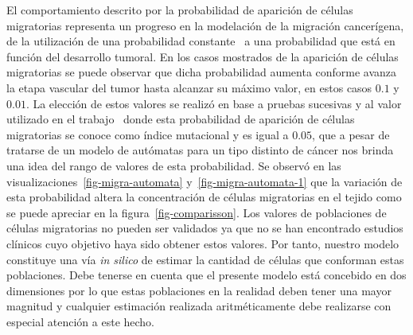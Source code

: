 El comportamiento descrito por la probabilidad de aparici\'on de c\'elulas migratorias representa un progreso en la modelaci\'on de la migraci\'on cancer\'igena, de la utilizaci\'on de una probabilidad constante~\cite{kansal3} a una probabilidad que est\'a en funci\'on del desarrollo tumoral. En los casos mostrados de la aparici\'on de c\'elulas migratorias se puede observar que dicha probabilidad aumenta conforme avanza la etapa vascular del tumor hasta alcanzar su m\'aximo valor, en estos casos $0$.$1$ y $0$.$01$. La elecci\'on de estos valores se realiz\'o en base a pruebas sucesivas y al valor utilizado en el trabajo~\cite{kansal3} donde esta probabilidad de aparici\'on de c\'elulas migratorias se conoce como \'indice mutacional y es igual a $0$.$05$, que a pesar de tratarse de un modelo de aut\'omatas para un tipo distinto de c\'ancer nos brinda una idea del rango de valores de esta probabilidad. Se observ\'o en las visualizaciones~\ref{fig-migra-automata} y~\ref{fig-migra-automata-1} que la variaci\'on de esta probabilidad altera la concentraci\'on de c\'elulas migratorias en el tejido como se puede apreciar en la figura~\ref{fig-comparisson}. Los valores de poblaciones de c\'elulas migratorias no pueden ser validados ya que no se han encontrado estudios cl\'inicos cuyo objetivo haya sido obtener estos valores. Por tanto, nuestro modelo constituye una v\'ia \emph{in silico} de estimar la cantidad de c\'elulas que conforman estas poblaciones. Debe tenerse en cuenta que el presente modelo est\'a concebido en dos dimensiones por lo que estas poblaciones en la realidad deben tener una mayor magnitud y cualquier estimaci\'on realizada aritm\'eticamente debe realizarse con especial atenci\'on a este hecho. 
